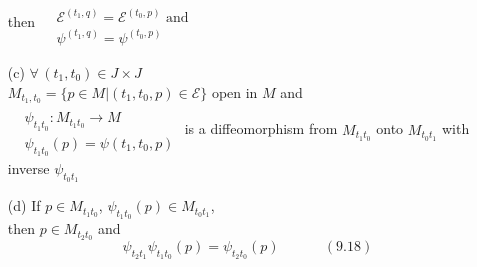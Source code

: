 \begin{theorem}[9.48]
\begin{enumerate}
then $\begin{aligned}
  & \quad \\
  & \mathcal{E}^{(t_1,q)} = \mathcal{E}^{(t_0,p)} \text{ and } \\
  & \psi^{(t_1,q)} = \psi^{(t_0,p)} \end{aligned}$
\item[(c)] $\forall \, (t_1,t_0) \in J \times J $ \\
$M_{t_1,t_0} = \lbrace p \in M | (t_1,t_0, p) \in \mathcal{E} \rbrace$ open in $M$ and \\
  $\begin{aligned}
  & \quad \\
  & \psi_{t_1t_0} : M_{t_1t_0} \to M \\
  & \psi_{t_1t_0}(p) = \psi(t_1,t_0,p) \end{aligned}$
is a diffeomorphism from $M_{t_1t_0}$ onto $M_{t_0t_1}$ with inverse $\psi_{t_0t_1}$
\item[(d)] If $p \in M_{t_1t_0} $, $\psi_{t_1t_0}(p) \in M_{t_0t_1}$, \\
then $p\in M_{t_2 t_0}$ and 
\begin{equation}
\psi_{t_2t_1} \psi_{t_1t_0}(p) = \psi_{t_2t_0}(p) \quad \quad \quad \, (9.18)
\end{equation}
\end{enumerate}

\end{theorem}

